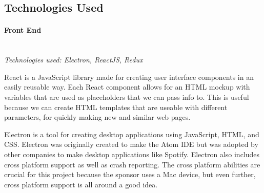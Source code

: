 \subsection{Technologies Used}

\paragraph{Front End} \mbox{} \\
\textit{Technologies used: Electron, ReactJS, Redux}\par
React is a JavaScript library made for creating user interface components in an easily reusable way. Each React component allows for an HTML mockup with variables that are used as placeholders that we can pass info to. This is useful because we can create HTML templates that are useable with different parameters, for quickly making new and similar web pages. \par
Electron is a tool for creating desktop applications using JavaScript, HTML, and CSS. Electron was originally created to make the Atom IDE but was adopted by other companies to make desktop applications like Spotify. Electron also includes cross platform support as well as crash reporting. The cross platform abilities are crucial for this project because the sponsor uses a Mac device, but even further, cross platform support is all around a good idea.\par

